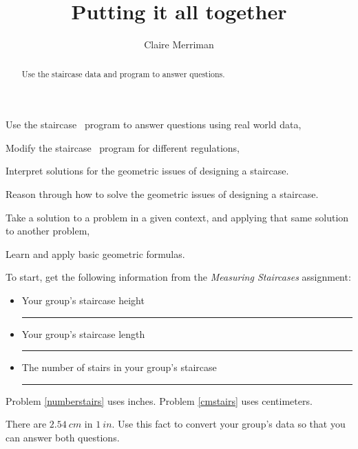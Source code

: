 \documentclass[handout,nooutcomes,noauthor,hints]{../ximera}
\title{Putting it all together}
\author{Claire Merriman}
\begin{document}
\begin{abstract}
Use the staircase data and program to answer questions.
\end{abstract}

\maketitle

\begin{listOutcomes}
 \item Use the staircase \snap\ program to answer questions using real world data,
 \item Modify the staircase \snap\ program for different regulations,
 \item Interpret solutions for the geometric issues of designing a staircase.
\item Reason through how to solve the geometric issues of designing a staircase.
\end{listOutcomes}

\begin{listObjectives}
 \item  Take a solution to a problem in a given context, and applying that same solution to another problem,
\item Learn and apply basic geometric formulas.
\end{listObjectives}

To start, get the following information from the \emph{Measuring Staircases} assignment:
\begin{itemize}
 \item Your group's staircase height \rule{2cm}{0.4pt}
 \item Your group's staircase length \rule{2cm}{0.4pt}
 \item The number of stairs in your group's staircase \rule{2cm}{0.4pt}
\end{itemize}

\begin{question}
Problem \ref{numberstairs} uses inches.  Problem \ref{cmstairs} uses centimeters. 

There are $2.54\ cm$ in $1\ in$. Use this fact to convert your group's data so that you can answer both questions. 
\end{question}

\mynewpage
\end{document}
